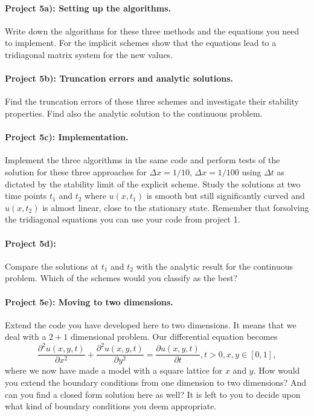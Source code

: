 \documentclass[%
oneside,                 %
final,                   %
10pt]{article}
\begin{document}
\paragraph{Project 5a): Setting up the algorithms.}
Write down the algorithms for these three methods and the equations you need to implement.
For the implicit schemes show that the equations lead to a tridiagonal matrix system for the new values.

\paragraph{Project 5b): Truncation errors and analytic solutions.}
Find the truncation errors of these three schemes and investigate their stability properties.
Find also the analytic solution to the continuous problem. 

\paragraph{Project 5c): Implementation.}
Implement the three algorithms in the same code and perform tests of the solution 
for these three approaches
for $\Delta x=1/10$, $\Delta x=1/100$ using  $\Delta t$ as dictated by the stability limit of the explicit scheme.
Study the solutions at two time points $t_1$ and $t_2$ where $u(x,t_1)$ is smooth but still significantly curved
and $u(x,t_2)$ is almost linear, close to the stationary state.
Remember that forsolving the tridiagonal equations you can use your code from project 1.  
\paragraph{Project 5d):}
Compare the solutions at $t_1$ and $t_2$ with the analytic result for the continuous problem.
Which of the schemes would you classify as the best?

\paragraph{Project 5e): Moving to two dimensions.}
Extend the code you have developed here to two
  dimensions. 
It means that we deal with a $2+1$ dimensional problem. Our differential equation becomes
\[
 \frac{\partial^2 u(x,y,t)}{\partial x^2}+\frac{\partial^2 u(x,y,t)}{\partial y^2} =\frac{\partial u(x,y,t)}{\partial t}, t> 0, x,y\in [0,1],
\]
where we now have made a model with a square lattice for $x$ and $y$. 
How would you extend the boundary conditions from one dimension to two dimensions? And can you
  find a closed form solution here as well?  It is left to you to decide upon what kind of boundary conditions
you deem appropriate.
\end{document}
